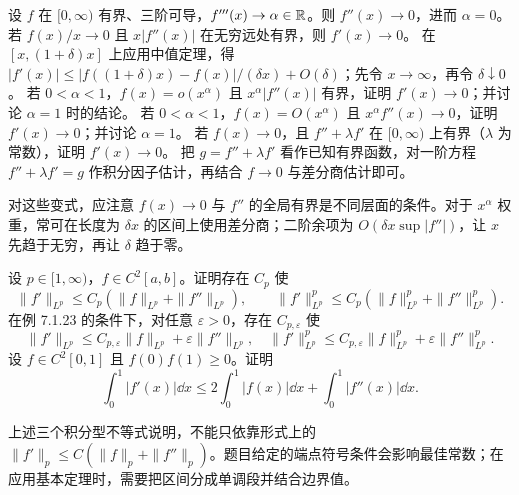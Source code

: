 设 $f$ 在 $[0,\infty)$ 有界、三阶可导，$f'''(x)\to\alpha\in\mathbb R$。则 $f''(x)\to0$，进而 $\alpha=0$。
若 $f(x)/x\to0$ 且 $x|f''(x)|$ 在无穷远处有界，则 $f'(x)\to0$。
\pf 在 $[x,(1+\delta)x]$ 上应用中值定理，得 $|f'(x)|\le |f((1+\delta)x)-f(x)|/(\delta x)+O(\delta)$；先令 $x\to\infty$，再令 $\delta\downarrow0$。
若 $0<\alpha<1$，$f(x)=o(x^\alpha)$ 且 $x^\alpha|f''(x)|$ 有界，证明 $f'(x)\to0$；并讨论 $\alpha=1$ 时的结论。
若 $0<\alpha<1$，$f(x)=O(x^\alpha)$ 且 $x^\alpha f''(x)\to0$，证明 $f'(x)\to0$；并讨论 $\alpha=1$。
若 $f(x)\to0$，且 $f''+\lambda f'$ 在 $[0,\infty)$ 上有界（$\lambda$ 为常数），证明 $f'(x)\to0$。
\pf 把 $g=f''+\lambda f'$ 看作已知有界函数，对一阶方程 $f''+\lambda f'=g$ 作积分因子估计，再结合 $f\to0$ 与差分商估计即可。
\par 对这些变式，应注意 $f(x)\to0$ 与 $f''$ 的全局有界是不同层面的条件。对于 $x^\alpha$ 权重，常可在长度为 $\delta x$ 的区间上使用差分商；二阶余项为 $O(\delta x\sup|f''|)$，让 $x$ 先趋于无穷，再让 $\delta$ 趋于零。

设 $p\in[1,\infty)$，$f\in C^2[a,b]$。证明存在 $C_p$ 使
\[\|f'\|_{L^p}\le C_p(\|f\|_{L^p}+\|f''\|_{L^p}),\qquad \|f'\|_{L^p}^p\le C_p(\|f\|_{L^p}^p+\|f''\|_{L^p}^p).\]
在例 7.1.23 的条件下，对任意 $\varepsilon>0$，存在 $C_{p,\varepsilon}$ 使
\[\|f'\|_{L^p}\le C_{p,\varepsilon}\|f\|_{L^p}+\varepsilon\|f''\|_{L^p},\quad
\|f'\|_{L^p}^p\le C_{p,\varepsilon}\|f\|_{L^p}^p+\varepsilon\|f''\|_{L^p}^p.\]
设 $f\in C^2[0,1]$ 且 $f(0)f(1)\ge0$。证明
\[\int_0^1|f'(x)|\dd x\le2\int_0^1|f(x)|\dd x+\int_0^1|f''(x)|\dd x.\]
\par 上述三个积分型不等式说明，不能只依靠形式上的 $\|f'\|_p\le C(\|f\|_p+\|f''\|_p)$。题目给定的端点符号条件会影响最佳常数；在应用基本定理时，需要把区间分成单调段并结合边界值。

